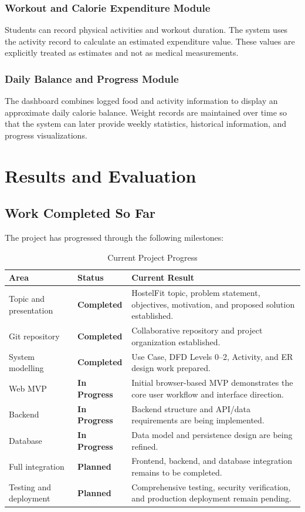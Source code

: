 \documentclass[11pt,a4paper]{article}
\newcommand{\statusdone}{\textbf{Completed}}
\newcommand{\statusprogress}{\textbf{In Progress}}
\newcommand{\statusplanned}{\textbf{Planned}}
\begin{document}
\subsection{Workout and Calorie Expenditure Module}
Students can record physical activities and workout duration. The system uses the activity record to calculate an estimated expenditure value. These values are explicitly treated as estimates and not as medical measurements.

\subsection{Daily Balance and Progress Module}
The dashboard combines logged food and activity information to display an approximate daily calorie balance. Weight records are maintained over time so that the system can later provide weekly statistics, historical information, and progress visualizations.

\chapter{Results and Evaluation}

\section{Work Completed So Far}
The project has progressed through the following milestones:

\begin{table}[h]
\centering
\begin{tabular}{p{}p{}p{}}
\toprule
\textbf{Area} & \textbf{Status} & \textbf{Current Result} \\
\midrule
Topic and presentation & \statusdone & HostelFit topic, problem statement, objectives, motivation, and proposed solution established. \\
Git repository & \statusdone & Collaborative repository and project organization established. \\
System modelling & \statusdone & Use Case, DFD Levels 0--2, Activity, and ER design work prepared. \\
Web MVP & \statusprogress & Initial browser-based MVP demonstrates the core user workflow and interface direction. \\
Backend & \statusprogress & Backend structure and API/data requirements are being implemented. \\
Database & \statusprogress & Data model and persistence design are being refined. \\
Full integration & \statusplanned & Frontend, backend, and database integration remains to be completed. \\
Testing and deployment & \statusplanned & Comprehensive testing, security verification, and production deployment remain pending. \\
\bottomrule
\end{tabular}
\caption{Current Project Progress}
\label{tab:progress}
\end{table}
\end{document}
